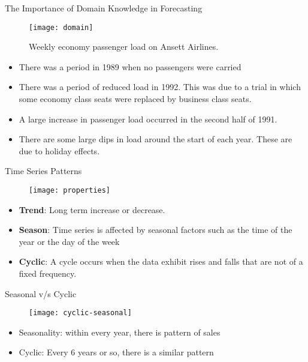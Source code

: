 \documentclass{beamer}
\begin{document}
\begin{frame}{The Importance of Domain Knowledge in Forecasting}
\begin{figure}
	\centering
	\texttt{[image: domain]}
	\caption{Weekly economy passenger load on Ansett Airlines.}
	\vspace{-15pt}
	\label{fig:forecast}
\end{figure}
\begin{itemize}
\item There was a period in 1989 when no passengers were carried
	\item There was a period of reduced load in 1992. This was due to a trial in which some economy class seats were replaced by business class seats.
	\pause
\item A large increase in passenger load occurred in the second half of 1991.
	\item There are some large dips in load around the start of each year. These are due to holiday effects.
\end{itemize}

\end{frame}

\begin{frame}{Time Series Patterns}
\begin{figure}
	\centering
	\texttt{[image: properties]}

	\vspace{-15pt}
	\label{fig:forecast}
\end{figure}

\begin{itemize}
\item \textbf{Trend}: Long term increase or decrease. 
	\pause
\item \textbf{Season}: Time series is affected by seasonal factors such as the time of the year or the day of the week
	\pause
\item \textbf{Cyclic}: A cycle occurs when the data exhibit rises and falls that are not of a fixed frequency.
\end{itemize}

\end{frame}

\begin{frame}{Seasonal v/s Cyclic}
\begin{figure}
	\centering
	\texttt{[image: cyclic-seasonal]}
	
	\vspace{-15pt}
	\label{fig:forecast}
\end{figure}

\begin{itemize}
\item Seasonality: within every year, there is pattern of sales
	\item Cyclic: Every 6 years or so, there is a similar pattern
\end{itemize}
\end{frame}
\end{document}
